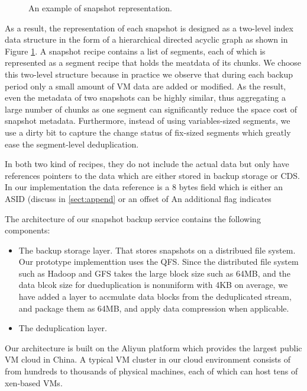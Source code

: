 \begin{figure}[htbp]
  \centering
  \caption{An example of snapshot representation.}
  \label{fig:snapshot}
\end{figure}
As a result, the representation of each snapshot is designed as a two-level index data structure 
in the form of a hierarchical directed acyclic graph as shown in Figure \ref{fig:snapshot}.
A snapshot recipe contains a list of segments, each of which is represented as a segment recipe
that holds the meatdata of its chunks. We choose this two-level structure because in practice we
observe that during each backup period only a small amount of VM data are added or modified. 
As the result, even the metadata of two snapshots can be highly similar, 
thus aggregating a large number of chunks as one segment can significantly reduce the space cost of snapshot metadata.
Furthermore, instead of using variables-sized segments, we use a dirty bit to capture the change status of fix-sized
segments which greatly ease the segment-level deduplication.

In both two kind of recipes, 
they do not include the actual data but only have
 references pointers to the data which are either stored in backup storage or CDS.
In our implementation the data reference is a 8 bytes field which is either an 
ASID (discuss in \ref{sect:append} or an offset of 
An additional flag indicates


The architecture of our snapshot backup service contains the following components:
\begin{itemize}

\item  The backup storage layer. 
That stores snapshots on a distribued file system. 
Our prototype implementtion uses the QFS.
Since the distributed file system such as Hadoop and GFS takes the large block size such as 64MB,
and the data blcok size for dueduplication is nonuniform with 4KB on average,
we have added a layer to accmulate  data blocks from the deduplicated stream, and 
package them as 64MB, and apply data compression when applicable.

\item The deduplication layer.

\end{itemize}

Our architecture is built on the Aliyun platform which provides the largest public VM cloud in China. 
A typical VM cluster in our cloud environment
consists of from hundreds to thousands of physical machines, each of which can
host tens of xen-based\cite{Barham2003} VMs.

